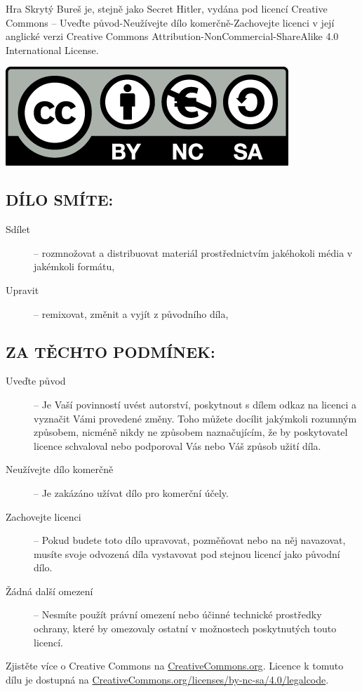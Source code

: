 \documentclass{article}
\begin{document}
        Hra Skrytý Bureš je, stejně jako Secret Hitler, vydána pod licencí Creative Commons -- Uveďte původ-Neužívejte dílo komerčně-Zachovejte licenci v její anglické verzi Creative Commons Attribution-NonCommercial-ShareAlike 4.0 International License.

        \includegraphics[width=.4\textwidth]{by-nc-sa_eu}

        \subsection*{DÍLO SMÍTE:}

            \begin{description}
                \item[Sdílet] -- rozmnožovat a distribuovat materiál prostřednictvím jakéhokoli média v jakémkoli formátu,
                \item[Upravit] -- remixovat, změnit a vyjít z původního díla,
            \end{description}

        \subsection*{ZA TĚCHTO PODMÍNEK:}

            \begin{description}
                \item[Uveďte původ] -- Je Vaší povinností uvést autorství, poskytnout s dílem odkaz na licenci a vyznačit Vámi provedené změny. Toho můžete docílit jakýmkoli rozumným způsobem, nicméně nikdy ne způsobem naznačujícím, že by poskytovatel licence schvaloval nebo podporoval Vás nebo Váš způsob užití díla.
                \item[Neužívejte dílo komerčně] -- Je zakázáno užívat dílo pro komerční účely.
                \item[Zachovejte licenci] -- Pokud budete toto dílo upravovat, pozměňovat nebo na něj navazovat, musíte svoje odvozená díla vystavovat pod stejnou licencí jako původní dílo.
                \item[Žádná další omezení] -- Nesmíte použít právní omezení nebo účinné technické prostředky ochrany, které by omezovaly ostatní v možnostech poskytnutých touto licencí.
            \end{description}

            Zjistěte více o Creative Commons na \url{CreativeCommons.org}. Licence k tomuto dílu je dostupná na \url{CreativeCommons.org/licenses/by-nc-sa/4.0/legalcode}.
\end{document}
